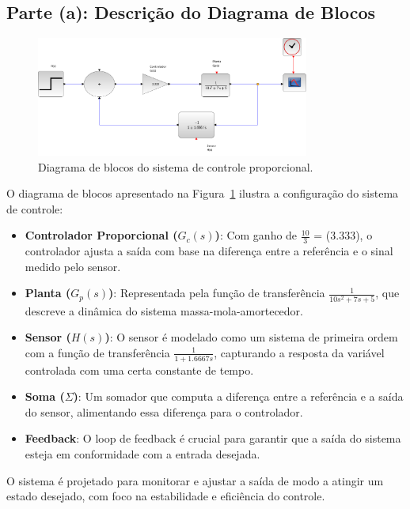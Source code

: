 \subsection{Parte (a): Descrição do Diagrama de Blocos}

\begin{figure}[H]
    \centering
    \includegraphics[width=0.8\textwidth]{atividades/4-atividade/assets/diagrama-blocos.png}
    \caption{Diagrama de blocos do sistema de controle proporcional.}
    \label{fig:diagrama_blocos}
\end{figure}

O diagrama de blocos apresentado na Figura~\ref{fig:diagrama_blocos} ilustra a configuração do sistema de controle:

\begin{itemize}
    \item \textbf{Controlador Proporcional (\(G_c(s)\))}: Com ganho de \(\frac{10}{3}\) = (\(3.333\)), o controlador ajusta a saída com base na diferença entre a referência e o sinal medido pelo sensor.
    \item \textbf{Planta (\(G_p(s)\))}: Representada pela função de transferência \(\frac{1}{10s^2 + 7s + 5}\), que descreve a dinâmica do sistema massa-mola-amortecedor.
    \item \textbf{Sensor (\(H(s)\))}: O sensor é modelado como um sistema de primeira ordem com a função de transferência \(\frac{1}{1 + 1.6667s}\), capturando a resposta da variável controlada com uma certa constante de tempo.
    \item \textbf{Soma (\(\Sigma\))}: Um somador que computa a diferença entre a referência e a saída do sensor, alimentando essa diferença para o controlador.
    \item \textbf{Feedback}: O loop de feedback é crucial para garantir que a saída do sistema esteja em conformidade com a entrada desejada.
\end{itemize}

O sistema é projetado para monitorar e ajustar a saída de modo a atingir um estado desejado, com foco na estabilidade e eficiência do controle.

